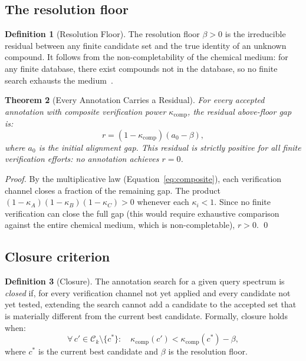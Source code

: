 \documentclass[twocolumn,10pt,a4paper]{article}
\theoremstyle{thmstyle}
\newtheorem{theorem}{Theorem}[section]
\theoremstyle{definition}
\newtheorem{definition}[theorem]{Definition}
\theoremstyle{remark}
\newcommand{\calC}{\mathcal{C}}
\newcommand{\flo}{\beta}
\begin{document}
\subsection{The resolution floor}

\begin{definition}[Resolution Floor]
\label{def:floor}
The resolution floor $\flo > 0$ is the irreducible residual between
any finite candidate set and the true identity of an unknown compound.
It follows from the non-completability of the chemical medium: for any
finite database, there exist compounds not in the database, so no
finite search exhausts the
medium~\citep{sachikonye2024scp,sachikonye2024generative}.
\end{definition}

\begin{theorem}[Every Annotation Carries a Residual]
\label{thm:residual}
For every accepted annotation with composite verification power
$\kappa_{\mathrm{comp}}$, the residual above-floor gap is:
\begin{equation}
r = (1 - \kappa_{\mathrm{comp}})(a_0 - \flo),
\label{eq:residual}
\end{equation}
where $a_0$ is the initial alignment gap. This residual is strictly
positive for all finite verification efforts: no annotation achieves
$r = 0$.
\end{theorem}

\begin{proof}
By the multiplicative law
(Equation~\ref{eq:composite}), each verification channel closes a
fraction of the remaining gap. The product
$(1-\kappa_A)(1-\kappa_B)(1-\kappa_C) > 0$ whenever each
$\kappa_i < 1$. Since no finite verification can close the full gap
(this would require exhaustive comparison against the entire chemical
medium, which is non-completable), $r > 0$. \qed
\end{proof}

\subsection{Closure criterion}

\begin{definition}[Closure]
\label{def:closure}
The annotation search for a given query spectrum is \emph{closed} if,
for every verification channel not yet applied and every candidate not
yet tested, extending the search cannot add a candidate to the
accepted set that is materially different from the current best
candidate. Formally, closure holds when:
\begin{equation}
\forall\, c' \in \calC_k \setminus \{c^*\}:\quad
\kappa_{\mathrm{comp}}(c') < \kappa_{\mathrm{comp}}(c^*) - \flo,
\label{eq:closure}
\end{equation}
where $c^*$ is the current best candidate and $\flo$ is the resolution
floor.
\end{definition}
\end{document}
